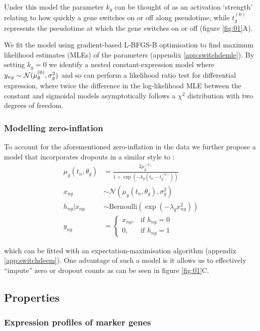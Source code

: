 Under this model the parameter $k_g$ can be thought of as an activation `strength' relating to how quickly a gene switches on or off along pseudotime, while $t^{(0)}_g$ represents the pseudotime at which the gene switches on or off (figure \ref{fig:01}A).

We fit the model using gradient-based L-BFGS-B optimisation to find maximum likelihood estimates (MLEs) of the parameters (appendix \ref{app:switchdemle}). By setting $k_g = 0$ we identify a nested constant-expression model where $y_{ng} \sim \mathcal{N}({\mu^{(0)}_g}, \sigma^2_g)$ and so can perform a likelihood ratio test for differential expression, where twice the difference in the log-likelihood MLE between the constant and sigmoidal models asymptotically follows a $\chi^2$ distribution with two degrees of freedom.

\subsubsection{Modelling zero-inflation}

To account for the aforementioned zero-inflation in the data we further propose a model that incorporates dropouts in a similar style to \cite{pierson2015zifa}:
\begin{equation}
\begin{aligned}
\mu_g(t_n, \theta_g) & = \frac{2 \mu^{(0)}_g}{1 + \exp\left(-k_g(t_n - t^{(0)}_g)\right)} \\
x_{ng} & \sim \mathcal{N}(\mu_g(t_n, \theta_g), \sigma_g^2) \\
h_{ng} | x_{ng} & \sim \mathrm{Bernoulli}(\exp(-\lambda_g x_{ng}^2)) \\
    y_{ng} &=
\begin{cases}
    x_{ng} ,& \text{if } h_{ng} = 0\\
    0,  & \text{if } h_{ng} = 1
\end{cases}
\end{aligned}
\end{equation}

which can be fitted with an expectation-maximisation algorithm (appendix \ref{app:switchdeem}). One advantage of such a model is it allows us to effectively ``impute'' zero or dropout counts as can be seen in figure \ref{fig:01}C.


\subsection{Properties}

\subsubsection{Expression profiles of marker genes}

